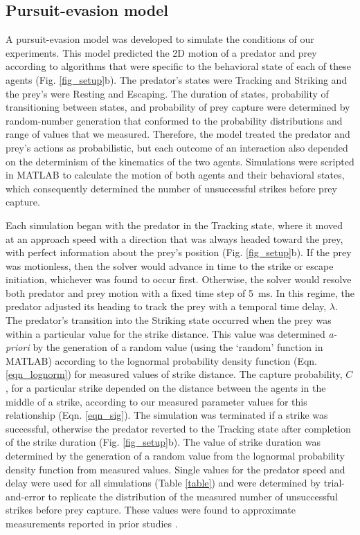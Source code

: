 \documentclass[]{rsos}%
\begin{document}
\subsection{Pursuit-evasion model}
A pursuit-evasion model was developed to simulate the conditions of our experiments. 
This model predicted the 2D motion of a predator and prey \cite{Isaacs:1965uz} according to algorithms that were specific to the behavioral state of each of these agents (Fig. \ref{fig_setup}b). 
The predator's states were Tracking and Striking and the prey's were Resting and Escaping. 
The duration of states, probability of transitioning between states, and probability of prey capture were determined by random-number generation that conformed to the probability distributions and range of values that we measured.
Therefore, the model treated the predator and prey's actions as probabilistic, but each outcome of an interaction also depended on the determinism of the kinematics of the two agents.
Simulations were scripted in MATLAB to calculate the motion of both agents and their behavioral states, which consequently determined the number of unsuccessful strikes before prey capture.

Each simulation began with the predator in the Tracking state, where it moved at an approach speed with a direction that was always headed toward the prey, with perfect information about the prey's position (Fig. \ref{fig_setup}b). 
If the prey was motionless, then the solver would advance in time to the strike or escape initiation, whichever was found to occur first.
Otherwise, the solver would resolve both predator and prey motion with a fixed time step of \SI{5}{\ms}. 
In this regime, the predator adjusted its heading to track the prey with a temporal time delay, $\lambda$.  
The predator's transition into the Striking state occurred when the prey was within a particular value for the strike distance. 
This value was determined \textit{a-priori} by the generation of a random value (using the `random' function in MATLAB) according to the lognormal probability density function (Eqn. \ref{eqn_lognorm}) for measured values of strike distance.
The capture probability, $C$, for a particular strike depended on the distance between the agents in the middle of a strike, according to our measured parameter values for this relationship (Eqn. \ref{eqn_sig}).
The simulation was terminated if a strike was successful, otherwise the predator reverted to the Tracking state after completion of the strike duration (Fig. \ref{fig_setup}b).
The value of strike duration was determined by the generation of a random value from the lognormal probability density function from measured values.
Single values for the predator speed and delay were used for all simulations (Table \ref{table}) and were determined by trial-and-error to replicate the distribution of the measured number of unsuccessful strikes before prey capture. 
These values were found to approximate measurements reported in prior studies \cite{McHenry:2005tc, Stewart:2013bha}. 
\end{document}
